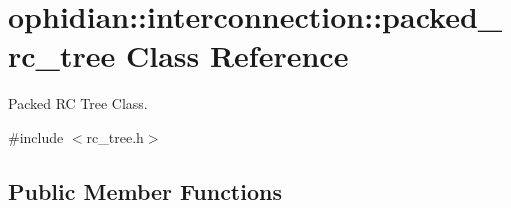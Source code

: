 \hypertarget{classophidian_1_1interconnection_1_1packed__rc__tree}{\section{ophidian\-:\-:interconnection\-:\-:packed\-\_\-rc\-\_\-tree Class Reference}
\label{classophidian_1_1interconnection_1_1packed__rc__tree}
}


Packed R\-C Tree Class.  




{\ttfamily \#include $<$rc\-\_\-tree.\-h$>$}

\subsection*{Public Member Functions}
